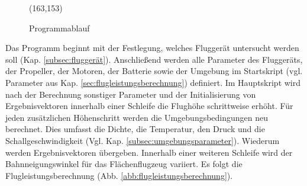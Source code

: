 \begin{center}
\begin{figure}[H]
\begin{struktogramm}(163,153)
	\whileend
		\change
				\change
				\ifend
			\whileend
			\change
		\ifend
	\ifend
\whileend
{}
\end{struktogramm}
\caption{Programmablauf}
\label{abb:programmstruktur}
\end{figure}
\end{center}
Das Programm beginnt mit der Festlegung, welches Fluggerät untersucht werden soll (Kap. \ref{subsec:fluggerät}). Anschließend werden alle Parameter des Fluggeräts, der Propeller, der Motoren, der Batterie sowie der Umgebung im Startskript (vgl. Parameter aus Kap. \ref{sec:flugleistungsberechnung}) definiert. Im Hauptskript wird nach der Berechnung sonstiger Parameter und der Initialisierung von Ergebnisvektoren innerhalb einer Schleife die Flughöhe schrittweise erhöht. Für jeden zusätzlichen Höhenschritt werden die Umgebungsbedingungen neu berechnet. Dies umfasst die Dichte, die Temperatur, den Druck und die Schallgeschwindigkeit (Vgl. Kap. \ref{subsec:umgebungsparameter}). Wiederum werden Ergebnisvektoren übergeben. Innerhalb einer weiteren Schleife wird der Bahnneigungswinkel für das Flächenflugzeug variiert. Es folgt die Flugleistungsberechnung (Abb. \ref{abb:flugleistungsberechnung}). 

